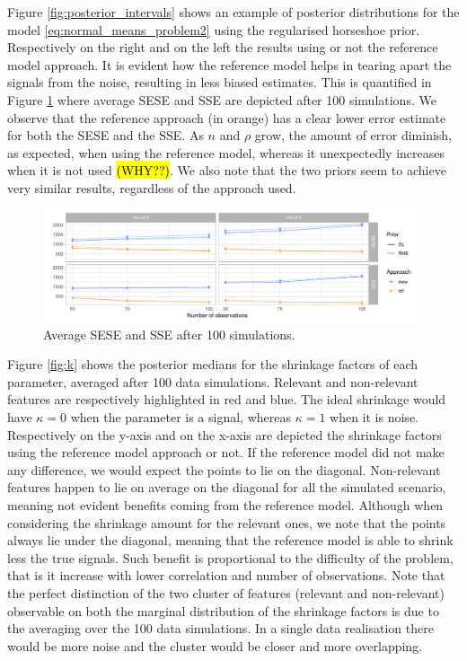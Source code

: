 \documentclass[american,]{article}
\theoremstyle{definition}
\begin{document}
Figure \ref{fig:posterior_intervals} shows an example of posterior distributions for the model \eqref{eq:normal_means_problem2} using the regularised horseshoe prior. Respectively on the right and on the left the results using or not the reference model approach. It is evident how the reference model helps in tearing apart the signals from the noise, resulting in less biased estimates. This is quantified in Figure \ref{fig:SESE_SSE} where average SESE and SSE are depicted after 100 simulations. We observe that the reference approach (in orange) has a clear lower error estimate for both the SESE and the SSE. As $n$ and $\rho$ grow, the amount of error diminish, as expected, when using the reference model, whereas it unexpectedly increases when it is not used \hl{(WHY??)}. We also note that the two priors seem to achieve very similar results, regardless of the approach used.

\begin{figure}[tp]
  \centering
  \includegraphics[width=0.98\textwidth]{graphics/SESE_SSE.pdf}
  \caption{Average SESE and SSE after 100 simulations.\\}
  \label{fig:SESE_SSE}
\end{figure}

Figure \ref{fig:k} shows the posterior medians for the shrinkage factors of each parameter, averaged after 100 data simulations. Relevant and non-relevant features are respectively highlighted in red and blue. The ideal shrinkage would have $\kappa=0$ when the parameter is a signal, whereas $\kappa=1$ when it is noise. Respectively on the y-axis and on the x-axis are depicted the shrinkage factors using the reference model approach or not. If the reference model did not make any difference, we would expect the points to lie on the diagonal. Non-relevant features happen to lie on average on the diagonal for all the simulated scenario, meaning not evident benefits coming from the reference model. Although when considering the shrinkage amount for the relevant ones, we note that the points always lie under the diagonal, meaning that the reference model is able to shrink less the true signals. Such benefit is proportional to the difficulty of the problem, that is it increase with lower correlation and number of observations. Note that the perfect distinction of the two cluster of features (relevant and non-relevant) observable on both the marginal distribution of the shrinkage factors is due to the averaging over the 100 data simulations. In a single data realisation there would be more noise and the cluster would be closer and more overlapping.
\end{document}
